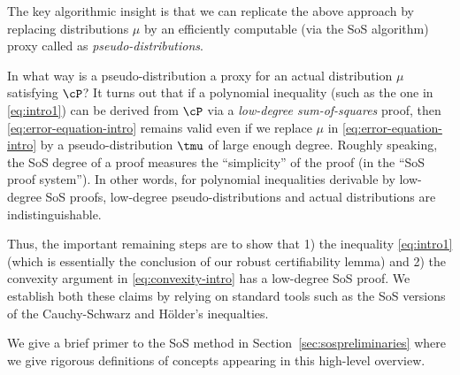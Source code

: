 The key algorithmic insight is that we can replicate the above approach by replacing distributions $\mu$ by an efficiently computable (via the SoS algorithm) proxy called as \emph{pseudo-distributions}.%

In what way is a pseudo-distribution a proxy for an actual distribution $\mu$ satisfying $\cP$? It turns out that if a polynomial inequality (such as the one in \eqref{eq:intro1}) can be derived from $\cP$ via a \emph{low-degree sum-of-squares} proof, then \eqref{eq:error-equation-intro} remains valid even if we replace $\mu$ in \eqref{eq:error-equation-intro} by a pseudo-distribution $\tmu$ of large enough degree. Roughly speaking, the SoS degree of a proof measures the ``simplicity'' of the proof (in the ``SoS proof system''). In other words, for polynomial inequalities derivable by low-degree SoS proofs, low-degree pseudo-distributions and actual distributions are indistinguishable. %

Thus, the important remaining steps are to show that 1) the inequality \eqref{eq:intro1} (which is essentially the conclusion of our robust certifiability lemma) and 2) the convexity argument in \eqref{eq:convexity-intro} has a low-degree SoS proof. We establish both these claims by relying on standard tools such as the SoS versions of the Cauchy-Schwarz and H\"older's inequalties. %

We give a brief primer to the SoS method in Section~\ref{sec:sospreliminaries} where we give rigorous definitions of concepts appearing in this high-level overview.

